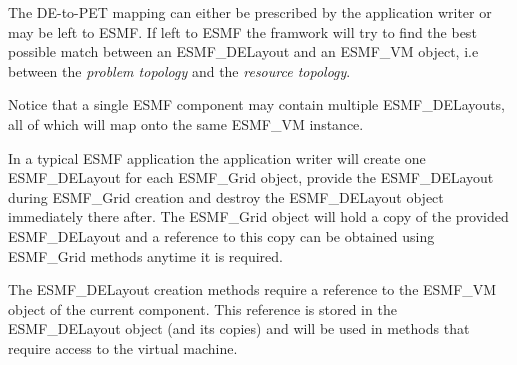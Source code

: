 The DE-to-PET mapping can either be prescribed by the application writer or may be left to ESMF. If left to ESMF the framwork will try to find the best possible match between an ESMF\_DELayout and an ESMF\_VM object, i.e between the {\em problem topology} and the {\em resource topology}.

Notice that a single ESMF component may contain multiple ESMF\_DELayouts, all of which will map onto the same ESMF\_VM instance. 


In a typical ESMF application the application writer will create one ESMF\_DELayout for each ESMF\_Grid object, provide the ESMF\_DELayout during ESMF\_Grid creation and destroy the ESMF\_DELayout object immediately there after. The ESMF\_Grid object will hold a copy of the provided ESMF\_DELayout and a reference to this copy can be obtained using ESMF\_Grid methods anytime it is required.

The ESMF\_DELayout creation methods require a reference to the ESMF\_VM object of the current component. This reference is stored in the ESMF\_DELayout object (and its copies) and will be used in methods that require access to the virtual machine.




